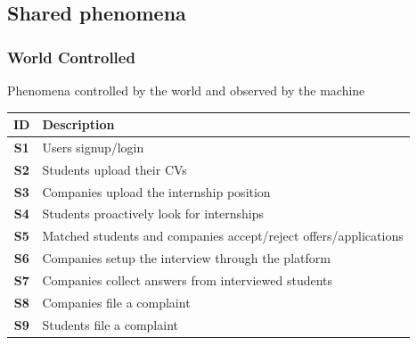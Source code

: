 \subsection{Shared phenomena}\label{subsec:shared-phenomena}
\subsubsection{World Controlled}
Phenomena controlled by the world and observed by the machine
\renewcommand{\arraystretch}{1.5} %
\begin{center}
    \begin{longtable}{|c|p{}|}
        \hline
        \rowcolor[HTML]{FFE5B4}
        \textbf{ID} & \textbf{Description} \\ \hline
        \rowcolor[HTML]{FFFFFF} %
        \textbf{S1} & Users signup/login \\ \hline
        \rowcolor[HTML]{F0F0F0} %
        \textbf{S2} & Students upload their CVs \\ \hline
        \rowcolor[HTML]{FFFFFF} %
        \textbf{S3} & Companies upload the internship position \\ \hline
        \rowcolor[HTML]{F0F0F0} %
        \textbf{S4} & Students proactively look for internships \\ \hline
        \rowcolor[HTML]{FFFFFF} %
        \textbf{S5} & Matched students and companies accept/reject offers/applications \\ \hline
        \rowcolor[HTML]{F0F0F0} %
        \textbf{S6} & Companies setup the interview through the platform \\ \hline
        \rowcolor[HTML]{FFFFFF} %
        \textbf{S7} & Companies collect answers from interviewed students \\ \hline
        \rowcolor[HTML]{F0F0F0} %
        \textbf{S8} & Companies file a complaint \\ \hline
        \rowcolor[HTML]{FFFFFF} %
        \textbf{S9} & Students file a complaint \\ \hline
    \end{longtable}
\end{center}



